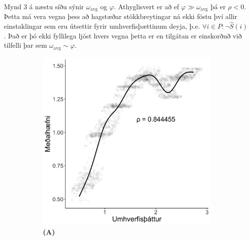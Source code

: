 \documentclass[12pt]{article}
\begin{document}
\par
\noindent 
Mynd 3 á næstu síðu sýnir $\omega_{\mathrm{avg}}$ og $\varphi$. Athyglisvert er að ef $\varphi \gg \omega_{\mathrm{avg}}$ þá er $\rho < 0$.
Þetta má vera vegna þess að hagstæðar stökkbreytingar ná ekki föstu því allir einstaklingar sem eru útsettir fyrir umhverfisþættinum deyja,
þ.e. $\forall i \in P: \lnot \hat S(i)$. Það er þó ekki fyllilega ljóst hvers vegna þetta er en tilgátan er einskorðuð við tilfelli þar sem
$\omega_{\mathrm{avg}} \sim \varphi$.
\begin{figure}[h]
    \centering
    \begin{subfigure}{.5\textwidth}
        \centering
        \includegraphics[width=\textwidth]{img/plotA.png}
        \caption*{\bfseries (A)}
    \end{subfigure}%
    \begin{subfigure}{.5\textwidth}
        \centering

\end{subfigure}
\end{figure}
\end{document}
